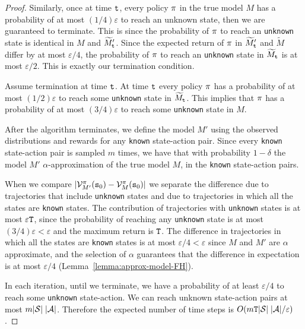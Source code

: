 \begin{proof}
Similarly, once at time ${\tt t}$, every policy $\pi$ in the true
model $M$ has a probability of at most $(1/4)\varepsilon$ to reach an
unknown state, then we are guaranteed to terminate. This is since the
probability of $\pi$ to reach an \texttt{unknown} state is identical in
$M$ and $\widetilde{M}'_{\tt t}$. Since the expected return of $\pi$
in $\widetilde{M}'_{\tt t}$ and $\widetilde{M}$ differ by at most
$\varepsilon/4$, the probability of $\pi$ to reach an \texttt{unknown}
state in $\widetilde{M}_{\tt t}$ is at most $\varepsilon/2$. This is
exactly our termination condition.
%



Assume termination at time ${\tt t}$. At time ${\tt t}$ every policy
$\pi$ has a probability of at most $(1/2)\varepsilon$ to reach
some \texttt{unknown} state in $\widetilde{M}_{\tt t}$. This implies that
$\pi$ has a probability of at most $(3/4)\varepsilon$ to reach
some \texttt{unknown} state in $M$.



After the algorithm terminates, we define the model $M'$ using the
observed distributions and rewards for any \texttt{known} state-action pair.
Since every \texttt{known} state-action pair is sampled $m$ times, we have
that with probability $1-\delta$ the model $M'$
$\alpha$-approximation of the true model $M$, in the \texttt{known}
state-action pairs.

When we compare
$|\mathcal{V}^\pi_{M'}({\tt s}_0)-\mathcal{V}^\pi_M({\tt s}_0)|$ we
separate the difference due to trajectories that include \texttt{unknown} states and due to trajectories in which all the states are \texttt{known} states. 
The contribution of trajectories with  \texttt{unknown} states is at most $\varepsilon{\tt T}$,
since the probability of reaching any \texttt{unknown} state is at most
$(3/4)\varepsilon<\varepsilon$ and the maximum return is
${\tt T}$. The difference in trajectories in which all the states are \texttt{known} states is at most
$\varepsilon/4<\varepsilon$ since $M$ and $M'$ are $\alpha$
approximate, and the selection of $\alpha$ guarantees that the
difference in expectation is at most $\varepsilon/4$
(Lemma~\ref{lemma:approx-model-FH}).

In each iteration, until we terminate, we have a probability of at
least $\varepsilon/4$ to reach some \texttt{unknown} state-action. We can reach
unknown state-action pairs at most $m |\mathcal{S}|\;|\mathcal{A}|$.
Therefore the expected number of time steps is  $O(m{\tt T}
|\mathcal{S}|\;|\mathcal{A}|/\varepsilon)$.
\end{proof}

